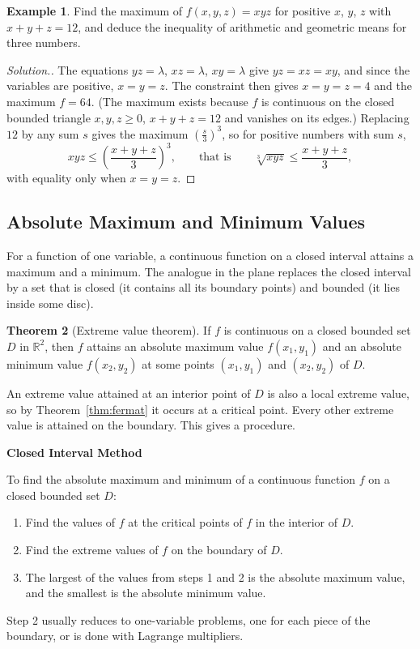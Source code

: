 \documentclass[11pt,a4paper]{article}
\theoremstyle{definition}
\newtheorem{thm}{Theorem}[subsection]
\newtheorem{exa}[thm]{Example}
\newenvironment{solution}
  {\renewcommand{\qedsymbol}{}\begin{proof}[\textit{Solution}.]}
  {\end{proof}}
\newcommand{\subhead}[1]{%
  \par\medskip\noindent\textbf{#1}\par\nobreak\smallskip}
\begin{document}
\begin{exa}
\label{ex:entropy}
Find the maximum of $f(x,y,z) = xyz$ for positive $x$, $y$, $z$ with
$x + y + z = 12$, and deduce the inequality of arithmetic and geometric means
for three numbers.
\end{exa}

\begin{solution}
The equations $yz = \lambda$, $xz = \lambda$, $xy = \lambda$ give
$yz = xz = xy$, and since the variables are positive, $x = y = z$. The constraint
then gives $x = y = z = 4$ and the maximum $f = 64$. (The maximum exists because
$f$ is continuous on the closed bounded triangle $x,y,z\geq 0$, $x+y+z = 12$ and
vanishes on its edges.) Replacing $12$ by any sum $s$ gives the maximum
$\left(\frac{s}{3}\right)^3$, so for positive numbers with sum $s$,
\[xyz\leq\left(\frac{x+y+z}{3}\right)^3,\qquad\text{that is}\qquad \sqrt[3]{xyz}
\leq\frac{x+y+z}{3},\]
with equality only when $x = y = z$.
\end{solution}

{\color[wave]{485}\subsection{Absolute Maximum and Minimum Values}}

For a function of one variable, a continuous function on a closed interval
attains a maximum and a minimum. The analogue in the plane replaces the closed
interval by a set that is closed (it contains all its boundary points) and
bounded (it lies inside some disc).

\begin{thm}[Extreme value theorem]
\label{thm:evt}
If $f$ is continuous on a closed bounded set $D$ in $\mathbb{R}^2$, then $f$
attains an absolute maximum value $f(x_1,y_1)$ and an absolute minimum value
$f(x_2,y_2)$ at some points $(x_1,y_1)$ and $(x_2,y_2)$ of $D$.
\end{thm}

An extreme value attained at an interior point of $D$ is also a local extreme
value, so by Theorem~\ref{thm:fermat} it occurs at a critical point. Every other
extreme value is attained on the boundary. This gives a procedure.

\subhead{Closed Interval Method}
To find the absolute maximum and minimum of a continuous function $f$ on a
closed bounded set $D$:
\begin{enumerate}
\item Find the values of $f$ at the critical points of $f$ in the interior of
$D$.

\item Find the extreme values of $f$ on the boundary of $D$.

\item The largest of the values from steps 1 and 2 is the absolute maximum
value, and the smallest is the absolute minimum value.
\end{enumerate}
Step 2 usually reduces to one-variable problems, one for each piece of the
boundary, or is done with Lagrange multipliers.
\end{document}
